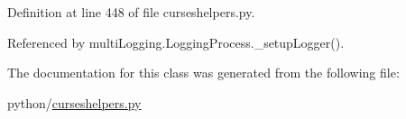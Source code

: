 Definition at line 448 of file curseshelpers.\-py.



Referenced by multi\-Logging.\-Logging\-Process.\-\_\-setup\-Logger().



The documentation for this class was generated from the following file\-:\begin{DoxyCompactItemize}
\item 
python/\hyperlink{curseshelpers_8py}{curseshelpers.\-py}\end{DoxyCompactItemize}

